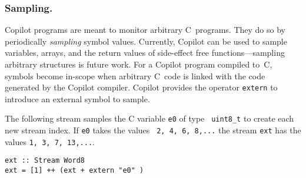 \subsubsection{Sampling.}
Copilot programs are meant to monitor arbitrary C~programs.  They do
so by
periodically \emph{sampling} symbol values.   Currently, Copilot can
be used to  sample variables, arrays,
and the return values of side-effect free functions---sampling arbitrary
structures is future work.  For a Copilot program compiled to~C, symbols become
in-scope when arbitrary C~code is linked with the code generated by the Copilot
compiler.  Copilot provides the operator {\tt extern} to introduce an external
symbol to sample.  %




The following stream samples the C variable {\tt e0} of type {\tt
  uint8\_t} to create each new stream index.  If {\tt e0} takes the values {\tt
 2, 4, 6, 8,...}  the stream {\tt ext} has the values {\tt 1, 3, 7, 13,...}.

\begin{lstlisting}[frame=single]
ext :: Stream Word8
ext = [1] ++ (ext + extern "e0" )
\end{lstlisting}
%

%
% 

%
%



